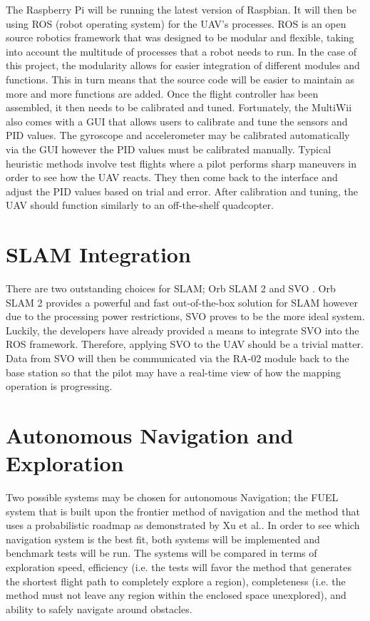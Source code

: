 \documentclass[english]{upeeei}
\begin{document}
\newline
\newline
The Raspberry Pi will be running the latest version of Raspbian. It will then be using ROS (robot operating system) for
the UAV's processes. ROS is an open source robotics framework that was designed to be modular and flexible, taking into
account the multitude of processes that a robot needs to run. In the case of this project, the modularity allows for
easier integration of different modules and functions. This in turn means that the source code will be easier to maintain
as more and more functions are added.
\newline
\newline
Once the flight controller has been assembled, it then needs to be calibrated and tuned. Fortunately, the MultiWii also
comes with a GUI that allows users to calibrate and tune the sensors and PID values. The gyroscope and accelerometer may
be calibrated automatically via the GUI however the PID values must be calibrated manually. Typical heuristic methods
involve test flights where a pilot performs sharp maneuvers in order to see how the UAV reacts. They then come back to the
interface and adjust the PID values based on trial and error. After calibration and tuning, the UAV should function 
similarly to an off-the-shelf quadcopter.
\section{SLAM Integration}
There are two outstanding choices for SLAM; Orb SLAM 2 \cite{OrbSlam2} and SVO \cite{SVO2017}. Orb SLAM 2 provides a
powerful and fast out-of-the-box solution for SLAM however due to the processing power restrictions, SVO proves to be the
more ideal system. Luckily, the developers have already provided a means to integrate SVO into the ROS framework.
Therefore, applying SVO to the UAV should be a trivial matter. Data from SVO will then be communicated via the RA-02
module back to the base station so that the pilot may have a real-time view of how the mapping operation is progressing.
\section{Autonomous Navigation and Exploration}
Two possible systems may be chosen for autonomous Navigation; the FUEL system\cite{Fuel2020} that is built
upon the frontier method of navigation and the method that uses a probabilistic roadmap as demonstrated by Xu et al.\cite{ProbNav}.
In order to see which navigation system is the best fit, both systems will be implemented and benchmark tests will be run.
The systems will be compared in terms of exploration speed, efficiency (i.e. the tests will favor the method that generates the
shortest flight path to completely explore a region), completeness (i.e. the method must not leave any region within the
enclosed space unexplored), and ability to safely navigate around obstacles.
\end{document}
